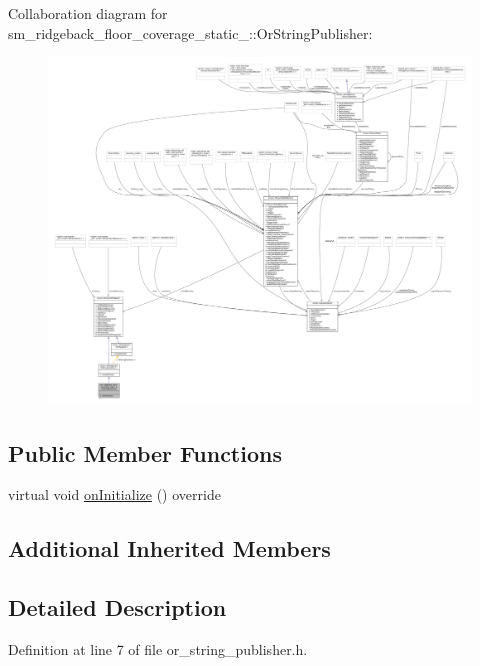 Collaboration diagram for sm\+\_\+ridgeback\+\_\+floor\+\_\+coverage\+\_\+static\+\_\+:\+:Or\+String\+Publisher\+:
\nopagebreak
\begin{figure}[H]
\begin{center}
\leavevmode
\includegraphics[width=350pt]{classsm__ridgeback__floor__coverage__static__1_1_1OrStringPublisher__coll__graph}
\end{center}
\end{figure}
\subsection*{Public Member Functions}
\begin{DoxyCompactItemize}
\item 
virtual void \hyperlink{classsm__ridgeback__floor__coverage__static__1_1_1OrStringPublisher_acf3ba60692bf9626ea438efde03c266d}{on\+Initialize} () override
\end{DoxyCompactItemize}
\subsection*{Additional Inherited Members}


\subsection{Detailed Description}


Definition at line 7 of file or\+\_\+string\+\_\+publisher.\+h.



